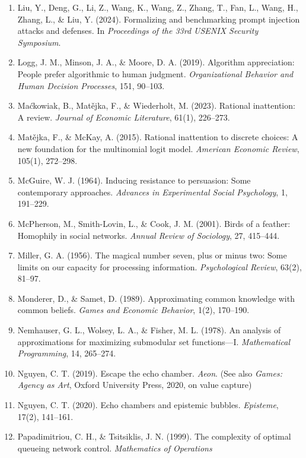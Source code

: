 \documentclass[
  11pt]{article}
\begin{document}
\begin{enumerate}
  experiment. \emph{The Annals of Mathematical Statistics}, 27(4),
  986--1005.
\item
  Liu, Y., Deng, G., Li, Z., Wang, K., Wang, Z., Zhang, T., Fan, L.,
  Wang, H., Zhang, L., \& Liu, Y. (2024). Formalizing and benchmarking
  prompt injection attacks and defenses. In \emph{Proceedings of the
  33rd USENIX Security Symposium}.
\item
  Logg, J. M., Minson, J. A., \& Moore, D. A. (2019). Algorithm
  appreciation: People prefer algorithmic to human judgment.
  \emph{Organizational Behavior and Human Decision Processes}, 151,
  90--103.
\item
  Maćkowiak, B., Matějka, F., \& Wiederholt, M. (2023). Rational
  inattention: A review. \emph{Journal of Economic Literature}, 61(1),
  226--273.
\item
  Matějka, F., \& McKay, A. (2015). Rational inattention to discrete
  choices: A new foundation for the multinomial logit model.
  \emph{American Economic Review}, 105(1), 272--298.
\item
  McGuire, W. J. (1964). Inducing resistance to persuasion: Some
  contemporary approaches. \emph{Advances in Experimental Social
  Psychology}, 1, 191--229.
\item
  McPherson, M., Smith-Lovin, L., \& Cook, J. M. (2001). Birds of a
  feather: Homophily in social networks. \emph{Annual Review of
  Sociology}, 27, 415--444.
\item
  Miller, G. A. (1956). The magical number seven, plus or minus two:
  Some limits on our capacity for processing information.
  \emph{Psychological Review}, 63(2), 81--97.
\item
  Monderer, D., \& Samet, D. (1989). Approximating common knowledge with
  common beliefs. \emph{Games and Economic Behavior}, 1(2), 170--190.
\item
  Nemhauser, G. L., Wolsey, L. A., \& Fisher, M. L. (1978). An analysis
  of approximations for maximizing submodular set functions---I.
  \emph{Mathematical Programming}, 14, 265--274.
\item
  Nguyen, C. T. (2019). Escape the echo chamber. \emph{Aeon}. (See also
  \emph{Games: Agency as Art}, Oxford University Press, 2020, on value
  capture)
\item
  Nguyen, C. T. (2020). Echo chambers and epistemic bubbles.
  \emph{Episteme}, 17(2), 141--161.
\item
  Papadimitriou, C. H., \& Tsitsiklis, J. N. (1999). The complexity of
  optimal queueing network control. \emph{Mathematics of Operations
}
\end{enumerate}
\end{document}
